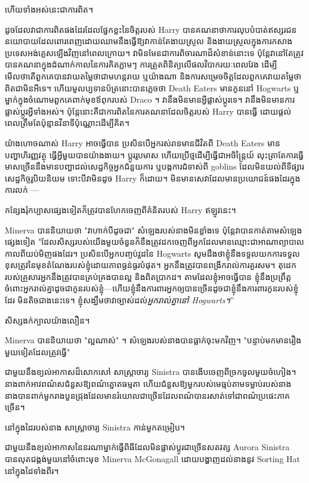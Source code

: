ហើយទាំងអស់នេះជាការពិត។

ដូចដែលវាជាការពិតផងដែរដែលផ្នែកខ្លះនៃចិត្តរបស់ Harry បានគណនាថាការលុបបំបាត់ឥស្សរជននយោបាយដែលពោរពេញដោយឈាមនឹងធ្វើឱ្យវាកាន់តែងាយស្រួល និងងាយស្រួលក្នុងការកសាងប្រទេសអង់គ្លេសឡើងវិញនៅពេលក្រោយ។ វាមិនមែនជាការពិចារណាដ៏សំខាន់នោះទេ ប៉ុន្តែវានៅតែត្រូវបានគណនាក្នុងដំណាក់កាលនៃការគិតភ្លាមៗ ការត្រួតពិនិត្យលើផលវិបាករយៈពេលវែង ដើម្បីមើលថាតើពួកគេបានវាយតម្លៃថាជាមហន្តរាយ ឬយ៉ាងណា និងការសម្រេចចិត្តដែលពួកគេវាយតម្លៃថាពិតជាមិនអីទេ។ ហើយមូលប្បទានប័ត្រនោះបានភ្លេចថា Death Eaters មានកូននៅ Hogwarts ឬម្នាក់ក្នុងចំណោមពួកគេពាក់មុខឪពុករបស់ Draco ។ វានឹងមិនមានអ្វីផ្លាស់ប្តូរទេ។ វានឹងមិនមានការផ្លាស់ប្តូរអ្វីទាំងអស់។ ប៉ុន្តែនោះគឺជាការពិតនៃការគណនាដែលចិត្តរបស់ Harry បានធ្វើ ដោយផ្តល់ពេលត្រឹមតែប៉ុន្មានវិនាទីប៉ុណ្ណោះដើម្បីគិត។

យ៉ាងហោចណាស់ Harry អាចធ្វើបាន ប្រសិនបើអ្នករស់រានមានជីវិតពី Death Eaters មានបញ្ហាហិរញ្ញវត្ថុ ធ្វើអ្វីមួយបានយ៉ាងងាយ។ ប្តូររូបមាស ហើយប្រើថ្មដើម្បីធ្វើជាអចិន្ត្រៃយ៍ លុះត្រាតែការធ្វើមាសច្រើននឹងមានបញ្ហាដល់សេដ្ឋកិច្ចអ្នកជំនួយការ ឬបង្កការជំទាស់ពី goblins ដែលមិនយល់ពីទីផ្សារសេដ្ឋកិច្ចរូបិយនិយម ទោះបីវាមិនដូច Harry ក៏ដោយ។ មិន​មាន​សេវា​ដែល​មាន​ប្រយោជន៍​ផង​ដែរ​ក្នុង​ការ​លក់ —

កន្សែងរុំកប្បាសផ្សេងទៀតក៏ត្រូវបានហែកចេញពីគំនិតរបស់ Harry ឥឡូវនេះ។

Minerva បាននិយាយថា "វាហាក់បីដូចជា" សំឡេងរបស់នាងមិនខ្លាំងទេ ប៉ុន្តែវាបានកាត់តាមសំឡេងផ្សេងទៀត "ដែលសិស្សរបស់យើងមួយចំនួនក៏នឹងត្រូវដកចេញពីអ្នកដែលមានឈ្មោះជាអាណាព្យាបាលកាលពីយប់មិញផងដែរ។ ប្រសិនបើអ្នកបញ្ចប់វួដនៃ Hogwarts សូមដឹងថាខ្ញុំនឹងទទួលយកការទទួលខុសត្រូវនៃមុខតំណែងរបស់ខ្ញុំដោយភាពធ្ងន់ធ្ងរបំផុត។ អ្នកនឹងត្រូវបានពង្រីករាល់ការគួរសម។ តុដេករបស់គ្រួសារអ្នកនឹងត្រូវបានគ្រប់គ្រងបានល្អ និងពិតប្រាកដ។ តាម​ដែល​ខ្ញុំ​អាច​ធ្វើ​បាន ខ្ញុំ​នឹង​ប្រព្រឹត្ត​ចំពោះ​អ្នក​រាល់​គ្នា​ដូច​ជា​កូន​របស់​ខ្ញុំ—ហើយ​ខ្ញុំ​នឹង​ការពារ​អ្នក​ឲ្យ​បាន​ច្រើន​ដូច​ជា​ខ្ញុំ​នឹង​ការពារ​កូន​របស់​ខ្ញុំ​ដែរ មិន​តិច​ជាង​នេះ​ទេ។ ខ្ញុំសង្ឃឹមថាវាច្បាស់ដល់\emph{អ្នករាល់គ្នានៅ Hogwarts។}”

សិស្សងក់ក្បាលយ៉ាងលឿន។

Minerva បាននិយាយថា "ល្អណាស់" ។ សំឡេងរបស់នាងបានធ្លាក់ចុះមកវិញ។ "បន្ទាប់មកមានរឿងមួយទៀតដែលត្រូវធ្វើ"

ជាមួយនឹងខ្យល់អាកាសដ៏សោកសៅ សាស្រ្តាចារ្យ Sinistra បានងើបចេញពីច្រកចូលមួយចំហៀង។ នាងពាក់អាវពណ៌សជំនួសឱ្យពណ៌ត្នោតធម្មតា ហើយជំនួសឱ្យមួករបស់មេធ្មប់តាមទម្លាប់របស់នាង នាងបានពាក់មួករាងបួនជ្រុងដែលមានរំយោលជាច្រើនដែលពណ៌បានរសាត់ទៅជាពណ៌ប្រផេះភាគច្រើន។

នៅក្នុងដៃរបស់នាង សាស្ត្រាចារ្យ Sinistra កាន់មួកតម្រៀប។

ជាមួយនឹងខ្យល់អាកាសនៃនរណាម្នាក់ធ្វើពិធីដែលមិនផ្លាស់ប្តូរជាច្រើនសតវត្ស Aurora Sinistra បានលុតជង្គង់មួយនៅចំពោះមុខ Minerva McGonagall ដោយបង្ហាញដល់នាងនូវ Sorting Hat នៅក្នុងដៃទាំងពីរ។

